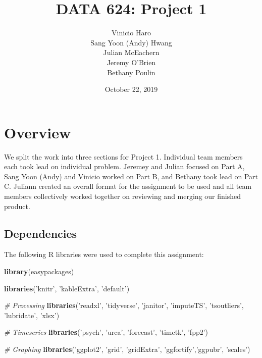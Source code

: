 \documentclass[openany]{book}
\title{DATA 624: Project 1}
\author{Vinicio Haro \\ Sang Yoon (Andy) Hwang \\ Julian McEachern \\ Jeremy O'Brien \\ Bethany Poulin}
\date{October 22, 2019}
\newenvironment{Shaded}{\begin{snugshade}}{\end{snugshade}}
\newcommand{\CommentTok}[1]{\textcolor[rgb]{0.56,0.35,0.01}{\textit{#1}}}
\newcommand{\KeywordTok}[1]{\textcolor[rgb]{0.13,0.29,0.53}{\textbf{#1}}}
\newcommand{\NormalTok}[1]{#1}
\newcommand{\StringTok}[1]{\textcolor[rgb]{0.31,0.60,0.02}{#1}}
\begin{document}
\maketitle

{
\setcounter{tocdepth}{1}
\tableofcontents
}
\hypertarget{overview}{%
\chapter*{Overview}\label{overview}}

We split the work into three sections for Project 1. Individual team
members each took lead on individual problem. Jeremey and Julian focused
on Part A, Sang Yoon (Andy) and Vinicio worked on Part B, and Bethany
took lead on Part C. Juliann created an overall format for the
assignment to be used and all team members collectively worked together
on reviewing and merging our finished product.

\hypertarget{dependencies}{%
\section*{Dependencies}\label{dependencies}}

The following R libraries were used to complete this assignment:

\begin{Shaded}
\begin{Highlighting}[]
\KeywordTok{library}\NormalTok{(easypackages)}

\KeywordTok{libraries}\NormalTok{(}\StringTok{'knitr'}\NormalTok{, }\StringTok{'kableExtra'}\NormalTok{, }\StringTok{'default'}\NormalTok{)}

\CommentTok{# Processing}
\KeywordTok{libraries}\NormalTok{(}\StringTok{'readxl'}\NormalTok{, }\StringTok{'tidyverse'}\NormalTok{, }\StringTok{'janitor'}\NormalTok{, }\StringTok{'imputeTS'}\NormalTok{, }\StringTok{'tsoutliers'}\NormalTok{, }\StringTok{'lubridate'}\NormalTok{, }\StringTok{'xlsx'}\NormalTok{)}

\CommentTok{# Timeseries }
\KeywordTok{libraries}\NormalTok{(}\StringTok{'psych'}\NormalTok{, }\StringTok{'urca'}\NormalTok{, }\StringTok{'forecast'}\NormalTok{, }\StringTok{'timetk'}\NormalTok{, }\StringTok{'fpp2'}\NormalTok{)}

\CommentTok{# Graphing}
\KeywordTok{libraries}\NormalTok{(}\StringTok{'ggplot2'}\NormalTok{, }\StringTok{'grid'}\NormalTok{, }\StringTok{'gridExtra'}\NormalTok{, }\StringTok{'ggfortify'}\NormalTok{,}\StringTok{'ggpubr'}\NormalTok{, }\StringTok{'scales'}\NormalTok{)}
\end{Highlighting}
\end{Shaded}
\end{document}
